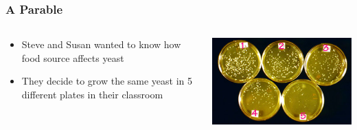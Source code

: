 \documentclass[14pt]{beamer}
\begin{document}
\begin{frame}
\frametitle{A Parable}
\begin{columns}
	\begin{column}{0.5\textwidth}
		\begin{itemize}
			\item<+-> Steve and Susan wanted to know how food source affects yeast
			\item<+-> They decide to grow the same yeast in 5 different plates in their classroom
		\end{itemize}
		\end{column}
	\begin{column}{0.5\textwidth}
		\begin{center}
     		\includegraphics[width=1\textwidth]{images_20170912_yeast.jpeg}
     	\end{center}
	\end{column}
\end{columns}
\end{frame}
\end{document}
